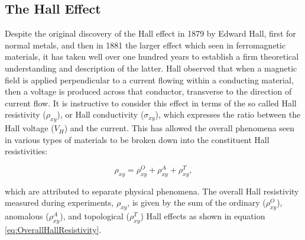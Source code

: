     \subsection{The Hall Effect}\label{subsec:HallEffect}
    Despite the original discovery of the Hall effect in 1879 by Edward Hall, first for normal metals\cite{Hall1879}, and then in 1881 the larger effect which seen in ferromagnetic materials\cite{Hall1881}, it has taken well over one hundred years to establish a firm theoretical understanding and description of the latter. Hall observed that when a magnetic field is applied perpendicular to a current flowing within a conducting material, then a voltage is produced across that conductor, transverse to the direction of current flow\cite{Hall1879}. It is instructive to consider this effect in terms of the so called Hall resistivity ($\rho_{xy}$), or Hall conductivity ($\sigma_{xy}$), which expresses the ratio between the Hall voltage ($V_{H}$) and the current. This has allowed the overall phenomena seen in various types of materials to be broken down into the constituent Hall resistivities:

    \begin{equation}\label{eq:OverallHallResistivity}
    	\rho_{xy} = \rho_{xy}^{O} + \rho_{xy}^{A} + \rho_{xy}^{T},    
    \end{equation}
	
    which are attributed to separate physical phenomena. The overall Hall resistivity measured during experiments, $\rho_{xy}$, is given by the sum of the ordinary ($\rho_{xy}^{O}$), anomalous ($\rho_{xy}^{A}$), and topological ($\rho_{xy}^{T}$) Hall effects as shown in equation \ref{eq:OverallHallResistivity}.

